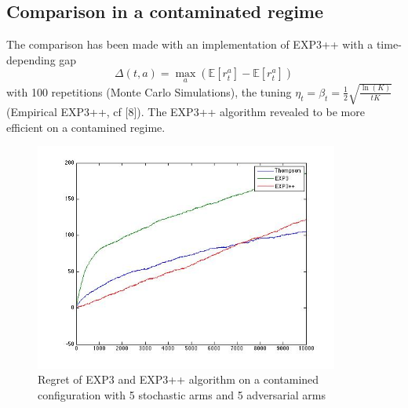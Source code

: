\documentclass[11pt]{article}
\begin{document}
\subsection*{Comparison in a contaminated regime}
The comparison has been made with an implementation of EXP3++ with a time-depending gap $$\Delta(t,a)=\max_{a}(\mathbb{E}[r_{t}^{a}]-\mathbb{E}[r_{t}^{a}])$$ with 100 repetitions (Monte Carlo Simulations), the tuning  $\eta_{t}=\beta_{t}=\frac{1}{2}\sqrt{\frac{\ln(K)}{tK}}$ (Empirical EXP3++, cf [8]). The EXP3++ algorithm revealed to be more efficient on a contamined regime.
\begin{figure}[!h]
   \begin{minipage}[c]{0.5 \linewidth}
   \centering
    \captionsetup{justification=centering,margin=1cm}
      \includegraphics[width=10cm]{comparaison_contamined.jpg}
      \caption{Regret of EXP3 and EXP3++ algorithm on a contamined configuration with 5 stochastic arms and 5 adversarial arms}
   \end{minipage} \hfill
\end{figure}~\\

\newpage
\end{document}
